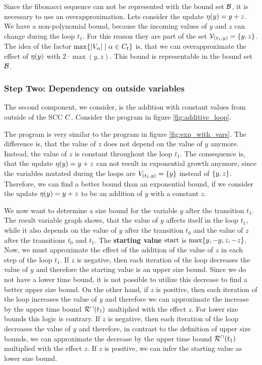 Since the fibonacci sequence can not be represented with the bound set $\mathcal{B}$, it is necessary to use an overapproximation.
Lets consider the update $\eta(y) = y + z$.
We have a non-polynomial bound, because the incoming values of $y$ and $z$ can change during the loop $t_1$.
For this reason they are part of the set $\mathcal{V}_{(t_1,y)} = \lbrace y,z \rbrace$.
The idea of the factor $\max \lbrace \left|V_\alpha\right| \mid \alpha \in C_t \rbrace$ is, that we can overapproximate the effect of $\eta(y)$ with $2 \cdot \max(y,z)$.
This bound is representable in the bound set $\mathcal{B}$. 

\subsubsection{Step Two: Dependency on outside variables}

The second component, we consider, is the addition with constant values from outside of the SCC $C$.
Consider the program in figure \ref{fig:additive_loop}.



The program is very similar to the program in figure \ref{fig:exp_with_vars}.
The difference is, that the value of $z$ does not depend on the value of $y$ anymore.
Instead, the value of $z$ is constant throughout the loop $t_1$.
The consequence is, that the update $\eta(y) = y + z$ can not result in exponential growth anymore, since the variables mutated during the loops are $V_{(t_1,y)} = \lbrace y \rbrace$ instead of $\lbrace y,z \rbrace$.
Therefore, we can find a better bound than an exponential bound, if we consider the update $\eta(y) = y + z$ to be an addition of $y$ with a constant $z$.

We now want to determine a size bound for the variable $y$ after the transition $t_1$.
The result variable graph shows, that the value of $y$ affects itself in the loop $t_1$, while it also depends on the value of $y$ after the transition $t_0$ and the value of $z$ after the transitions $t_0$ and $t_1$.
The \textbf{starting value} $\text{start}$ is $\max \lbrace y,-y,z,-z \rbrace$.
Now, we must approximate the effect of the addition of the value of $z$ in each step of the loop $t_1$.
If $z$ is negative, then each iteration of the loop decreases the value of $y$ and therefore the starting value is an upper size bound.
Since we do not have a lower time bound, it is not possible to utilize this decrease to find a better upper size bound.
On the other hand, if $z$ is positive, then each iteration of the loop increases the value of $y$ and therefore we can approximate the increase by the upper time bound ${\mathcal{R}^\sqcap}(t_1)$ multiplied with the effect $z$.
For lower size bounds this logic is contrary.
If $z$ is negative, then each iteration of the loop decreases the value of $y$ and therefore, in contrast to the definition of upper size bounds, we can approximate the decrease by the upper time bound ${\mathcal{R}^\sqcap}(t_1)$ multiplied with the effect $z$.
If $z$ is positive, we can infer the starting value as lower size bound.

